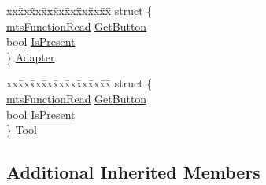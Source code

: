 {\bf }\par
\begin{DoxyCompactItemize}
\item 
\begin{tabbing}
xx\=xx\=xx\=xx\=xx\=xx\=xx\=xx\=xx\=\kill
struct \{\\
\>\hyperlink{classmts_function_read}{mtsFunctionRead} \hyperlink{classmts_intuitive_research_kit_p_s_m_aa4f1aaa075c8c71a96ddcba9336d0e0a}{GetButton}\\
\>bool \hyperlink{classmts_intuitive_research_kit_p_s_m_a199ab540aff093a65dc386575a0198f3}{IsPresent}\\
\} \hyperlink{classmts_intuitive_research_kit_p_s_m_a37e95bf9098b1506463996e5efde9a21}{Adapter}\\

\end{tabbing}\item 
\begin{tabbing}
xx\=xx\=xx\=xx\=xx\=xx\=xx\=xx\=xx\=\kill
struct \{\\
\>\hyperlink{classmts_function_read}{mtsFunctionRead} \hyperlink{classmts_intuitive_research_kit_p_s_m_aa4f1aaa075c8c71a96ddcba9336d0e0a}{GetButton}\\
\>bool \hyperlink{classmts_intuitive_research_kit_p_s_m_a199ab540aff093a65dc386575a0198f3}{IsPresent}\\
\} \hyperlink{classmts_intuitive_research_kit_p_s_m_aa987ac9053a953253f805fa5366687b4}{Tool}\\

\end{tabbing}\end{DoxyCompactItemize}

\subsection*{Additional Inherited Members}


